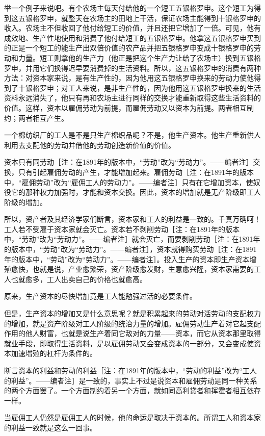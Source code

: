 \documentclass[a4paper,twoside,12pt,AutoFakeBold]{ctexart}
\begin{document}
举一个例子来说吧。有个农场主每天付给他的一个短工五银格罗申。这个短工为得到这五银格罗申，就整天在农场主的田地上干活，保证农场主能得到十银格罗申的收入。农场主不但收回了他付给短工的价值，并且还把它增加了一倍。可见，他有成效地、生产性地使用和消费了他付给短工的五银格罗申。他拿这五银格罗申买到的正是一个短工的能生产出双倍价值的农产品并把五银格罗申变成十银格罗申的劳动和力量。短工则拿他的生产力（他正是把这个生产力让给了农场主）换到五银格罗申，并用它们换得迟早要消费掉的生活资料。所以，这五银格罗申的消费有两种方法：对资本家来说，是有生产性的，因为他用这五银格罗申换来的劳动力使他得到了十银格罗申；对工人来说，是非生产性的，因为他用这五银格罗申换来的生活资料永远消失了，他只有再和农场主进行同样的交换才能重新取得这些生活资料的价值。这样，资本以雇佣劳动为前提，而雇佣劳动又以资本为前提。两者相互制约；两者相互产生。

一个棉纺织厂的工人是不是只生产棉织品呢？不是，他生产资本。他生产重新供人利用去支配他的劳动并借他的劳动创造新价值的价值。

资本只有同劳动［注：在1891年的版本中，“劳动”改为“劳动力”。——编者注］交换，只有引起雇佣劳动的产生，才能增加起来。雇佣劳动［注：在1891年的版本中，“雇佣劳动”改为“雇佣工人的劳动力”。——编者注］只有在它增加资本，使奴役它的那种权力加强时，才能和资本交换。因此，资本的增加就是无产阶级即工人阶级的增加。

所以，资产者及其经济学家们断言，资本家和工人的利益是一致的。千真万确呵！工人若不受雇于资本家就会灭亡。资本若不剥削劳动［注：在1891年的版本中，“劳动”改为“劳动力”。——编者注］就会灭亡，而要剥削劳动［注：在1891年的版本中，“劳动”改为“劳动力”。——编者注］，资本就得购买劳动［注：在1891年的版本中，“劳动”改为“劳动力”。——编者注］。投入生产的资本即生产资本增殖愈快，也就是说，产业愈繁荣，资产阶级愈发财，生意愈兴隆，资本家需要的工人也就愈多，工人出卖自己的价格也就愈高。

原来，生产资本的尽快增加竟是工人能勉强过活的必要条件。

但是，生产资本的增加又是什么意思呢？就是积累起来的劳动对活劳动的支配权力的增加，就是资产阶级对工人阶级的统治力量的增加。雇佣劳动生产着对它起支配作用的他人财富，也就是说生产着同它敌对的力量——资本，而它从资本那里取得就业手段，即取得生活资料，是以雇佣劳动又会变成资本的一部分，又会变成使资本加速增殖的杠杆为条件的。

断言资本的利益和劳动的利益［注：在1891年的版本中，“劳动的利益”改为“工人的利益”。——编者注］是一致的，事实上不过是说资本和雇佣劳动是同一种关系的两个方面罢了。一个方面制约着另一个方面，就如同高利贷者和挥霍者相互依存一样。

当雇佣工人仍然是雇佣工人的时候，他的命运是取决于资本的。所谓工人和资本家的利益一致就是这么一回事。
\end{document}
